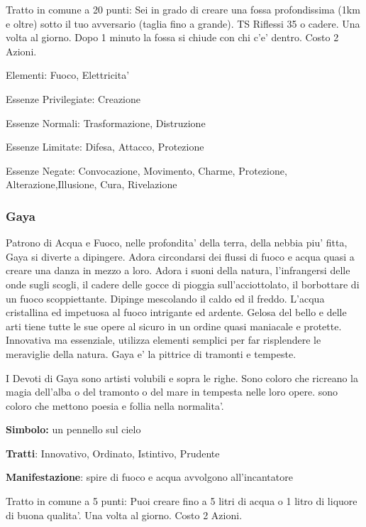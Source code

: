 \documentclass[a4paper,11pt,twoside,openany]{book}
\begin{document}
{		Tratto in comune a 20 punti: Sei in grado di creare una fossa profondissima (1km e oltre) sotto il tuo avversario (taglia fino a grande). TS Riflessi 35 o cadere. Una volta al giorno. Dopo 1 minuto la fossa si chiude con chi c'e' dentro. Costo 2 Azioni.
		
		\bigskip
		
		Elementi: Fuoco, Elettricita'
		
		\bigskip
		
		Essenze Privilegiate: Creazione
		
		Essenze Normali: Trasformazione, Distruzione
		
		Essenze Limitate: Difesa, Attacco, Protezione
		
		Essenze Negate: Convocazione, Movimento, Charme, Protezione, Alterazione,Illusione, Cura, Rivelazione
		
		\subsubsection{Gaya}
		
		\label{gaya}
		
		Patrono di Acqua e Fuoco, nelle profondita' della terra, della nebbia piu' fitta, Gaya si diverte a dipingere. Adora circondarsi dei flussi di fuoco e acqua quasi a creare una danza in mezzo a loro. Adora i suoni della natura, l'infrangersi delle onde sugli scogli, il cadere delle gocce di pioggia sull'acciottolato, il borbottare di un fuoco scoppiettante. Dipinge mescolando il caldo ed il freddo. L'acqua cristallina ed impetuosa al fuoco intrigante ed ardente. Gelosa del bello e delle arti tiene tutte le sue opere al sicuro in un ordine quasi maniacale e protette. Innovativa ma essenziale, utilizza elementi semplici per far risplendere le meraviglie della natura. Gaya e' la pittrice di tramonti e tempeste.
		
		I Devoti di Gaya sono artisti volubili e sopra le righe. Sono coloro che ricreano la magia dell'alba o del tramonto o del mare in tempesta nelle loro opere. sono coloro che mettono poesia e follia nella normalita'. 
		
		\textbf{Simbolo:} un pennello sul cielo
		
		\textbf{Tratti}: Innovativo, Ordinato, Istintivo, Prudente
		
		\textbf{Manifestazione}: spire di fuoco e acqua avvolgono all'incantatore
		
		\bigskip
		
		Tratto in comune a 5 punti: Puoi creare fino a 5 litri di acqua o 1 litro di liquore di buona qualita'. Una volta al giorno. Costo 2 Azioni.
		
}
\end{document}
